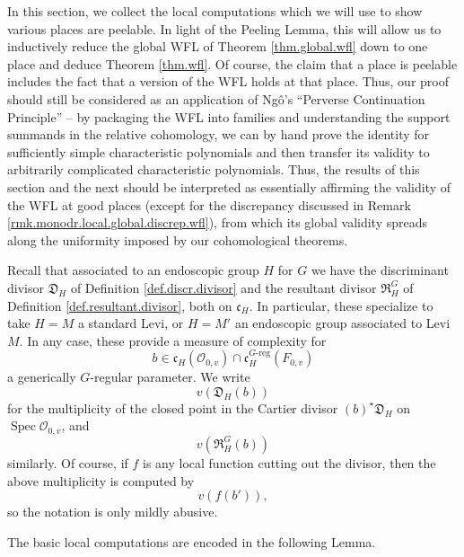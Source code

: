\documentclass[openany]{amsbook}
\theoremstyle{definition}
\theoremstyle{remark}
\numberwithin{equation}{section}
\renewcommand{\O}{\mathcal{O}}
\renewcommand{\-}{\operatorname{-}}
\newcommand{\Spec}{\operatorname{Spec}}
\newcommand{\fc}{\mathfrak{c}}
\newcommand{\fD}{\mathfrak{D}}
\newcommand{\fR}{\mathfrak{R}}
\newcommand{\Greg}{G\text{-reg}}
\begin{document}
In this section, we collect the local computations which we will use to show various places are peelable. In light of the Peeling Lemma, this will allow us to inductively reduce the global WFL of Theorem \ref{thm.global.wfl} down to one place and deduce Theorem \ref{thm.wfl}. Of course, the claim that a place is peelable includes the fact that a version of the WFL holds at that place. Thus, our proof should still be considered as an application of Ng\^{o}'s ``Perverse Continuation Principle'' -- by packaging the WFL into families and understanding the support summands in the relative cohomology, we can by hand prove the identity for sufficiently simple characteristic polynomials and then transfer its validity to arbitrarily complicated characteristic polynomials. Thus, the results of this section and the next should be interpreted as essentially affirming the validity of the WFL at good places (except for the discrepancy discussed in Remark \ref{rmk.monodr.local.global.discrep.wfl}), from which its global validity spreads along the uniformity imposed by our cohomological theorems.

Recall that associated to an endoscopic group $H$ for $G$ we have the discriminant divisor $\fD_H$ of Definition \ref{def.discr.divisor} and the resultant divisor $\fR_H^G$ of Definition \ref{def.resultant.divisor}, both on $\fc_H$. In particular, these specialize to take $H = M$ a standard Levi, or $H = M'$ an endoscopic group associated to Levi $M$. In any case, these provide a measure of complexity for $$b \in \fc_{H}(\O_{0,v}) \cap \fc_{H}^{\Greg}(F_{0,v})$$ a generically $G$-regular parameter. We write
$$
    v(\fD_{H}(b))
$$
for the multiplicity of the closed point in the Cartier divisor $(b)^\star \fD_{H}$ on $\Spec \O_{0,v}$, and 
$$
    v(\fR_{H}^G(b)) 
$$
similarly. Of course, if $f$ is any local function cutting out the divisor, then the above multiplicity is computed by
$$
    v(f(b')),
$$
so the notation is only mildly abusive. 

The basic local computations are encoded in the following Lemma.
\end{document}
